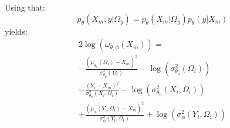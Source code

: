 Using that:
$$
p_\theta(X_m,y|\Omega_y) = p_\theta(X_m|\Omega_y) p_\theta(y|X_m)
$$
yields:
\begin{multline*}
2\log(\omega_{\theta,\phi}(X_m)) = \\
- \frac{( \mu_{\theta_p}(\Omega_i) - X_m )^2}{\sigma^2_{\theta_p}(\Omega_i)} - \log(\sigma^2_{\theta_p}(\Omega_i)) \\
- \frac{( Y_i - X_m )^2}{\sigma^2_{\theta_n}(X_i,\Omega_i)} - \log(\sigma^2_{\theta_n}(X_i,\Omega_i)) \\
+ \frac{( \mu_\phi(Y_i,\Omega_i) - X_m )^2}{\sigma^2_{\phi}(Y_i,\Omega_i)} + \log(\sigma^2_{\phi}(Y_i,\Omega_i))
\end{multline*}
